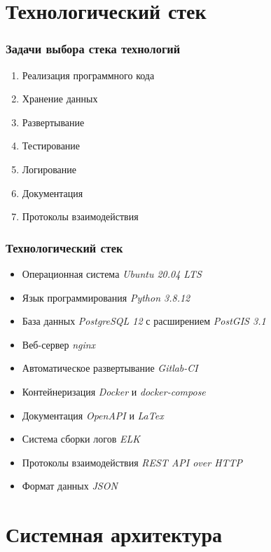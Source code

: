 \section{Технологический стек}

\begin{frame}
\frametitle{Задачи выбора стека технологий}
\begin{enumerate}
    \item Реализация программного кода
    \item Хранение данных
    \item Развертывание
    \item Тестирование
    \item Логирование
    \item Документация
    \item Протоколы взаимодействия
\end{enumerate}
\end{frame}

\begin{frame}
\frametitle{Технологический стек}
\begin{itemize}
    \item Операционная система \textit{Ubuntu 20.04 LTS}
    \item Язык программирования \textit{Python 3.8.12}
    \item База данных \textit{PostgreSQL 12} с расширением \textit{PostGIS 3.1}
    \item Веб-сервер \textit{nginx}
    \item Автоматическое развертывание \textit{Gitlab-CI}
    \item Контейнеризация \textit{Docker} и \textit{docker-compose}
    \item Документация \textit{OpenAPI} и \textit{LaTex}
    \item Система сборки логов \textit{ELK}
    \item Протоколы взаимодействия \textit{REST API over HTTP}
    \item Формат данных \textit{JSON}
\end{itemize}
\end{frame}


\section{Системная архитектура}

